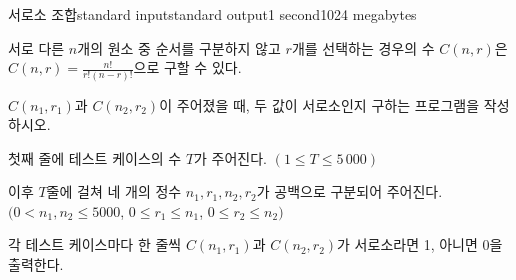 \begin{problem}{서로소 조합}{standard input}{standard output}{1 second}{1024 megabytes}

서로 다른 $n$개의 원소 중 순서를 구분하지 않고 $r$개를 선택하는 경우의 수 $C(n, r)$은 $C(n, r) = \frac{n!}{r!(n-r)!}$으로 구할 수 있다.

$C(n_1, r_1)$과 $C(n_2, r_2)$이 주어졌을 때, 두 값이 서로소인지 구하는 프로그램을 작성하시오.

\InputFile
첫째 줄에 테스트 케이스의 수 $T$가 주어진다. $(1 \le T \le 5\,000)$

이후 $T$줄에 걸쳐 네 개의 정수 $n_1, r_1, n_2, r_2$가 공백으로 구분되어 주어진다. $(0 < n_1, n_2 \leq 5000$, $0 \leq r_1 \leq n_1$, $0 \leq r_2 \leq n_2)$


\OutputFile
각 테스트 케이스마다 한 줄씩 $C(n_1, r_1)$과 $C(n_2, r_2)$가 서로소라면 1, 아니면 0을 출력한다.

\Example

\begin{example}
%
\end{example}

\end{problem}


